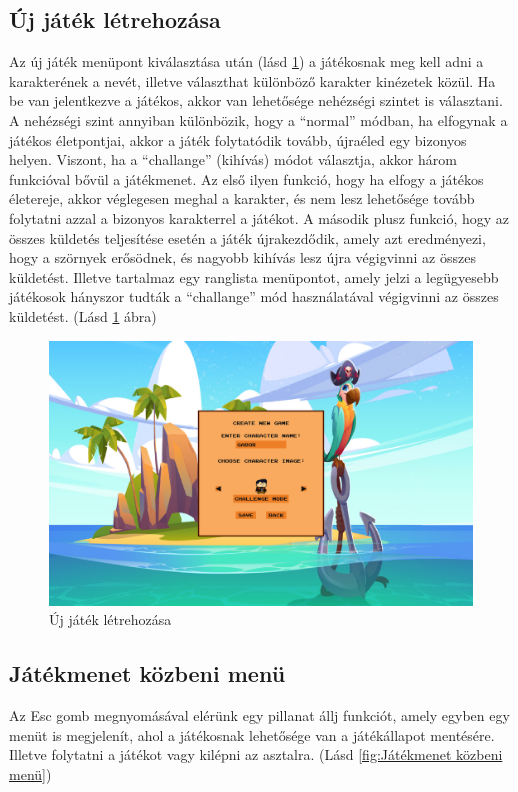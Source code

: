 \subsection{Új játék létrehozása}
 Az új játék menüpont kiválasztása után (lásd \ref{fig:Új játék létrehozása}) a játékosnak meg kell adni a karakterének a nevét, illetve választhat különböző karakter kinézetek közül. Ha be van jelentkezve a játékos, akkor van lehetősége nehézségi szintet is választani.
A nehézségi szint annyiban különbözik, hogy a ``normal'' módban, ha elfogynak a játékos életpontjai, akkor a játék folytatódik tovább, újraéled egy bizonyos helyen. Viszont, ha a ``challange'' (kihívás) módot választja, akkor három funkcióval bővül a játékmenet. Az első ilyen funkció, hogy ha elfogy a játékos életereje, akkor véglegesen meghal a karakter, és nem lesz lehetősége tovább folytatni azzal a bizonyos karakterrel a játékot. A második plusz funkció, hogy az összes küldetés teljesítése esetén a játék újrakezdődik, amely azt eredményezi, hogy a szörnyek erősödnek, és nagyobb kihívás lesz újra végigvinni az összes küldetést. Illetve tartalmaz egy ranglista menüpontot, amely jelzi a legügyesebb játékosok hányszor tudták a ``challange'' mód használatával végigvinni az összes küldetést. (Lásd \ref{fig:Új játék létrehozása} ábra)

\begin{figure}[H]
    \centering
    \includegraphics[width=14.0truecm]{images/newgame.png}
    \caption{Új játék létrehozása}
    \label{fig:Új játék létrehozása}
\end{figure}

\subsection{Játékmenet közbeni menü}
 Az Esc gomb megnyomásával elérünk egy pillanat állj funkciót, amely egyben egy menüt is megjelenít, ahol a játékosnak lehetősége van a játékállapot mentésére. Illetve folytatni a játékot vagy kilépni az asztalra. (Lásd \ref{fig:Játékmenet közbeni menü})

